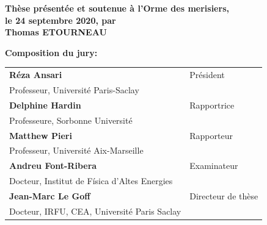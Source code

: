 \begin{titlepage}
\textbf{Thèse présentée et soutenue à l'Orme des merisiers, }\\
\textbf{le 24 septembre 2020, par} \\
\bigskip
\Large {\color{Prune} \textbf{Thomas ETOURNEAU}}


\vspace{\fill} %

\flushleft \small \textbf{Composition du jury:}
\bigskip



\scriptsize
\begin{tabular}{|p{8cm}l}
\arrayrulecolor{Prune}
\textbf{Réza Ansari} &   Président\\ 
Professeur, Université Paris-Saclay & \\
\textbf{Delphine Hardin} &  Rapportrice \\ 
Professeure, Sorbonne Université   &   \\ 
\textbf{Matthew Pieri} &  Rapporteur \\ 
Professeur, Université Aix-Marseille  &   \\ 
\textbf{Andreu Font-Ribera} &  Examinateur \\ 
Docteur, Institut de Física d’Altes Energies   &   \\ 
\textbf{Jean-Marc Le Goff} &  Directeur de thèse \\ 
Docteur, IRFU, CEA, Université Paris Saclay   &   \\ 

\end{tabular} 





\end{titlepage}
